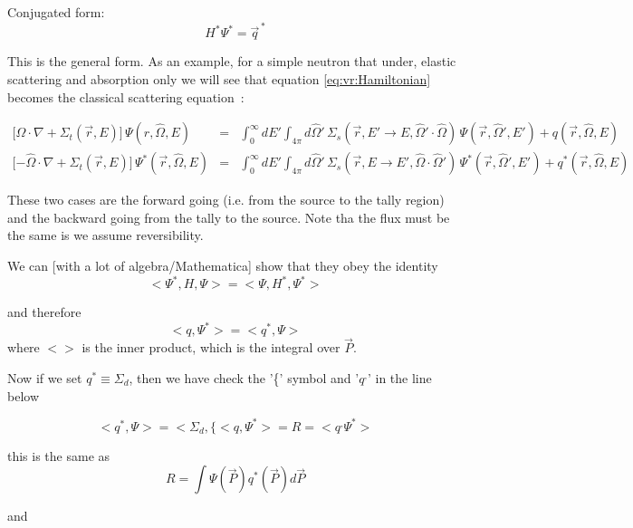 Conjugated form:
\begin{equation}
  H^* \Psi^*  =  \vec{q}^{\,*} 
\end{equation}

This is the general form. As an example, for a simple neutron that under,
elastic scattering and absorption only we will see that equation \eqref{eq:vr:Hamiltonian} becomes
the classical  scattering equation~\cite[Eq.\,1]{arXiv:1612.00793}:

\begin{eqnarray}
  \lbrack\Omega \cdot \nabla + \Sigma_t(\vec{r},E)\rbrack \, \Psi(r,\hat\Omega,E) & = & \int^\infty_0 dE' \int_{4\pi}
  d\hat\Omega' \, \Sigma_s(\vec{r},E' \to E,\hat\Omega' \cdot \hat\Omega) \, \Psi(\vec{r},\hat\Omega',E') + q(\vec{r},\hat\Omega,E) \\
  \lbrack-\hat\Omega \cdot \nabla + \Sigma_t(\vec{r},E)\rbrack \, \Psi^*(\vec{r},\hat\Omega,E) & = & \int^\infty_0 dE' \int_{4\pi}
  d\hat\Omega' \, \Sigma_s(\vec{r},E \to E',\hat\Omega \cdot \hat\Omega') \, \Psi^*(\vec{r},\hat\Omega',E') + q^*(\vec{r},\hat\Omega,E) 
\end{eqnarray}


These two cases are the forward going (i.e. from the source to the tally region) and the backward going from the
tally to the source. Note tha the flux must be the same is we assume reversibility.

We can [with a lot of algebra/Mathematica] show that they obey the identity
\begin{equation}
  < \Psi^*,H,\Psi >  =  <\Psi, H^*, \Psi^*> 
\end{equation}

and therefore 
\begin{equation}
  < q,\Psi^* >  =  <q^*,\Psi> 
\end{equation}
where $< >$ is the inner product, which is the integral over $\vec{P}$.

Now if we set $q^* \equiv \Sigma_d$, then we have \alert{check the '\{' symbol and '$q^,$' in the line below}

\begin{equation}
<q^*,\Psi>  = <\Sigma_d,\{< q,\Psi^* >  =  R = <q^,\Psi^*> 
\end{equation}

this is the same as
\begin{equation*}
  R = \int \Psi(\vec{P}) q^*(\vec{P}) d\vec{P}
\end{equation*}

and

